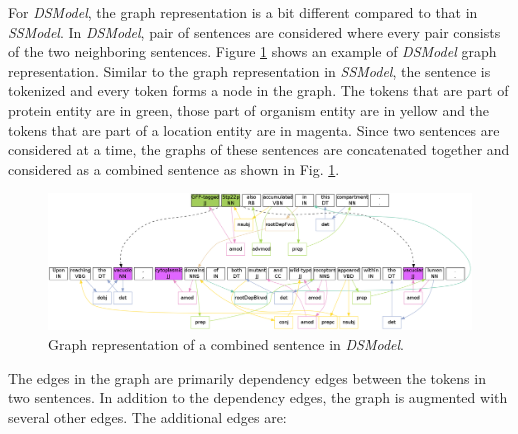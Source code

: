 For \textit{DSModel}, the graph representation is a bit different compared to that in \textit{SSModel}. In \textit{DSModel}, pair of sentences are considered where every pair consists of the two neighboring sentences. Figure \ref{fig:DSGraph} shows an example of \textit{DSModel} graph representation. Similar to the graph representation in \textit{SSModel}, the sentence is tokenized and every token forms a node in the graph. The tokens that are part of protein entity are in green, those part of organism entity are in yellow and the tokens that are part of a location entity are in magenta. Since two sentences are considered at a time, the graphs of these sentences are concatenated together and considered as a combined sentence as shown in Fig. \ref{fig:DSGraph}.

\begin{figure}
\centering
\includegraphics[scale=0.3]{figures/DiffSentenceGraph.png}
\caption{Graph representation of a combined sentence in \textit{DSModel}.}\label{fig:DSGraph}
\end{figure}

The edges in the graph are primarily dependency edges between the tokens in two sentences. In addition to the dependency edges, the graph is augmented with several other edges. The additional edges are:

